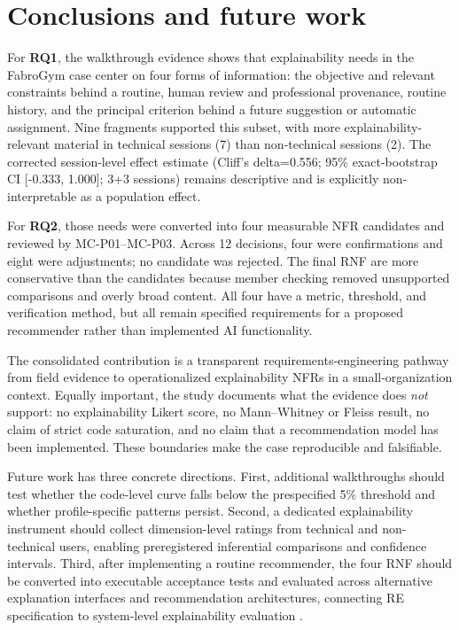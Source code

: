 \documentclass[pdflatex,sn-basic]{sn-jnl}
\begin{document}
\section{Conclusions and future work}\label{sec:conclusion}
For \textbf{RQ1}, the walkthrough evidence shows that explainability needs in the FabroGym case center on four forms of information: the objective and relevant constraints behind a routine, human review and professional provenance, routine history, and the principal criterion behind a future suggestion or automatic assignment. Nine fragments supported this subset, with more explainability-relevant material in technical sessions (7) than non-technical sessions (2). The corrected session-level effect estimate (Cliff's delta=0.556; 95\% exact-bootstrap CI [-0.333, 1.000]; 3+3 sessions) remains descriptive and is explicitly non-interpretable as a population effect.

For \textbf{RQ2}, those needs were converted into four measurable NFR candidates and reviewed by MC-P01--MC-P03. Across 12 decisions, four were confirmations and eight were adjustments; no candidate was rejected. The final RNF are more conservative than the candidates because member checking removed unsupported comparisons and overly broad content. All four have a metric, threshold, and verification method, but all remain specified requirements for a proposed recommender rather than implemented AI functionality.

The consolidated contribution is a transparent requirements-engineering pathway from field evidence to operationalized explainability NFRs in a small-organization context. Equally important, the study documents what the evidence does \emph{not} support: no explainability Likert score, no Mann--Whitney or Fleiss result, no claim of strict code saturation, and no claim that a recommendation model has been implemented. These boundaries make the case reproducible and falsifiable.

Future work has three concrete directions. First, additional walkthroughs should test whether the code-level curve falls below the prespecified 5\% threshold and whether profile-specific patterns persist. Second, a dedicated explainability instrument should collect dimension-level ratings from technical and non-technical users, enabling preregistered inferential comparisons and confidence intervals. Third, after implementing a routine recommender, the four RNF should be converted into executable acceptance tests and evaluated across alternative explanation interfaces and recommendation architectures, connecting RE specification to system-level explainability evaluation \cite{chazette2022,gedikli2014,zhangchen2020}.
\end{document}
